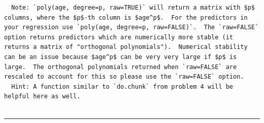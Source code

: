 \documentclass[]{article}
\begin{document}
\begin{verbatim}
  Note: `poly(age, degree=p, raw=TRUE)` will return a matrix with $p$ columns, where the $p$-th column is $age^p$.  For the predictors in your regression use `poly(age, degree=p, raw=FALSE)`.  The `raw=FALSE` option returns predictors which are numerically more stable (it returns a matrix of "orthogonal polynomials").  Numerical stability can be an issue because $age^p$ can be very very large if $p$ is large.  The orthogonal polynomials returned when `raw=FALSE` are rescaled to account for this so please use the `raw=FALSE` option.   
  Hint: A function similar to `do.chunk` from problem 4 will be helpful here as well.   
    
\end{verbatim}

\begin{center}\rule{0.5\linewidth}{\linethickness}\end{center}
\end{document}
